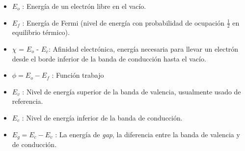 \documentclass[a4paper]{article}
\begin{document}
\begin{itemize}
	\item $E_o$ : Energía de un electrón libre en el vacío.
	\item $E_f$ : Energía de Fermi (nivel de energía con probabilidad de ocupación $\frac{1}{2}$ en equilibrio térmico).
	\item $\chi$ = $E_o$ - $E_c$: Afinidad electrónica, energía necesaria para llevar un electrón desde el borde inferior de la banda de conducción hasta el vacío.
	\item $\phi = E_o - E_f$ : Función trabajo 
	\item $ E_v$ : Nivel de energía superior de la banda de valencia, usualmente usado de referencia.
	\item $ E_c$ : Nivel de energía inferior de la banda de conducción.
	\item $E_g = E_c - E_v$ : La energía de \textit{gap}, la diferencia entre la banda de valencia y de conducción.
\end{itemize}
\end{document}
